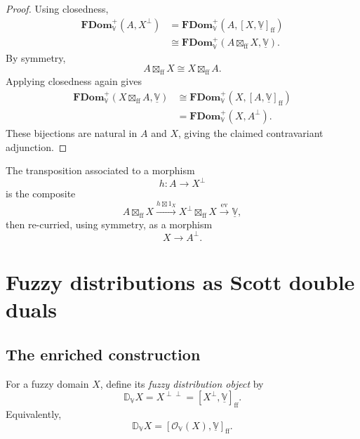 \begin{proof}
Using closedness,
\[
\begin{aligned}
    \mathbf{FDom}_{\mathbb V}^{+}(A,X^{\perp})
    &=
    \mathbf{FDom}_{\mathbb V}^{+}
    (A,[X,\underline{\mathbb V}]_{\mathrm{ff}})
    \\
    &\cong
    \mathbf{FDom}_{\mathbb V}^{+}
    (A\boxtimes_{\mathrm{ff}}X,\underline{\mathbb V}).
\end{aligned}
\]
By symmetry,
\[
    A\boxtimes_{\mathrm{ff}}X
    \cong
    X\boxtimes_{\mathrm{ff}}A.
\]
Applying closedness again gives
\[
\begin{aligned}
    \mathbf{FDom}_{\mathbb V}^{+}
    (X\boxtimes_{\mathrm{ff}}A,\underline{\mathbb V})
    &\cong
    \mathbf{FDom}_{\mathbb V}^{+}
    (X,[A,\underline{\mathbb V}]_{\mathrm{ff}})
    \\
    &=
    \mathbf{FDom}_{\mathbb V}^{+}
    (X,A^{\perp}).
\end{aligned}
\]
These bijections are natural in \(A\) and \(X\), giving the claimed
contravariant adjunction.
\end{proof}

The transposition associated to a morphism
\[
    h:A\to X^{\perp}
\]
is the composite
\[
    A\boxtimes_{\mathrm{ff}}X
    \xrightarrow{h\boxtimes 1_X}
    X^{\perp}\boxtimes_{\mathrm{ff}}X
    \xrightarrow{\operatorname{ev}}
    \underline{\mathbb V},
\]
then re-curried, using symmetry, as a morphism
\[
    X\to A^{\perp}.
\]

\section{Fuzzy distributions as Scott double duals}
\label{sec:fuzzy-distributions-scott-double-duals}

\subsection{The enriched construction}
\label{subsec:fuzzy-distributions-enriched}

\begin{definition}
\label{def:fuzzy-distribution-object}
For a fuzzy domain \(X\), define its \emph{fuzzy distribution object} by
\[
    \mathbb D_{\mathbb V}X
    =
    X^{\perp\perp}
    =
    [X^{\perp},\underline{\mathbb V}]_{\mathrm{ff}}.
\]
Equivalently,
\[
    \mathbb D_{\mathbb V}X
    =
    [\mathcal O_{\mathbb V}(X),\underline{\mathbb V}]_{\mathrm{ff}}.
\]
\end{definition}

